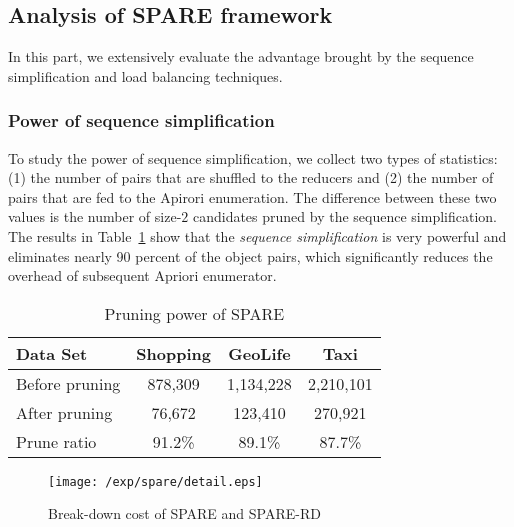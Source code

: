 \subsection{Analysis of SPARE framework}
In this part, we extensively evaluate the advantage brought by the
sequence simplification and load balancing techniques.

\subsubsection{Power of sequence simplification}
To study the power of sequence simplification,
we collect two types of statistics: (1) the number of pairs that
are shuffled to the reducers and (2) the number of pairs that
are fed to the Apirori enumeration. The difference between these two values is the number of size-$2$ candidates pruned by the sequence simplification.
The results in Table~\ref{tbl:pruning} show that the \emph{sequence simplification} is very powerful and eliminates nearly 90 percent of the object pairs, which significantly reduces the overhead of subsequent Apriori enumerator.

\begin{table}[h]
\centering
\begin{tabular}{|l|c|c|c|}
\hline 
\textbf{Data Set} & \textbf{Shopping} & \textbf{GeoLife} & \textbf{Taxi} \\ 
\hline 
Before pruning & 878,309 &  1,134,228 & 2,210,101 \\ 
\hline 
After pruning & 76,672 & 123,410 & 270,921 \\ 
\hline 
Prune ratio & 91.2\% & 89.1\% & 87.7\% \\ 
\hline 
\end{tabular} 

\caption{Pruning power of SPARE}
\label{tbl:pruning}
\end{table}

\begin{figure}[h]
\centering
	  \texttt{[image: /exp/spare/detail.eps]}
    \caption{Break-down cost of SPARE and SPARE-RD}
    \label{exp:wl}
%    
\end{figure}

